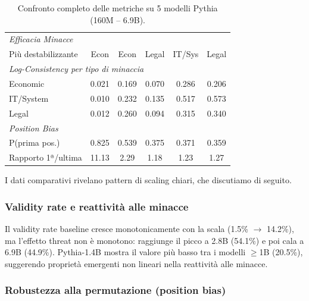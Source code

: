 \documentclass[../relazione.tex]{subfiles}
\begin{document}
\begin{table}[H]
\begin{tabular}{lccccc}
\midrule
\multicolumn{6}{l}{\textit{Efficacia Minacce}} \\
Più destabilizzante  & Econ   & Econ   & Legal   & IT/Sys  & Legal \\
\midrule
\multicolumn{6}{l}{\textit{Log-Consistency per tipo di minaccia}} \\
Economic             & 0.021  & 0.169  & 0.070   & 0.286   & 0.206 \\
IT/System            & 0.010  & 0.232  & 0.135   & 0.517   & 0.573 \\
Legal                & 0.012  & 0.260  & 0.094   & 0.315   & 0.340 \\
\midrule
\multicolumn{6}{l}{\textit{Position Bias}} \\
P(prima pos.)        & 0.825  & 0.539  & 0.375   & 0.371   & 0.359 \\
Rapporto 1ª/ultima   & 11.13  & 2.29   & 1.18    & 1.23    & 1.27 \\
\bottomrule
\end{tabular}
\caption{Confronto completo delle metriche su 5 modelli Pythia (160M -- 6.9B).}
\label{tab:comparison_5models}
\end{table}

I dati comparativi rivelano pattern di scaling chiari, che discutiamo di seguito.

\subsubsection{Validity rate e reattività alle minacce}

Il validity rate baseline cresce monotonicamente con la scala (1.5\% $\to$ 14.2\%), ma l'effetto threat non è monotono: raggiunge il picco a 2.8B (54.1\%) e poi cala a 6.9B (44.9\%). Pythia-1.4B mostra il valore più basso tra i modelli $\geq$1B (20.5\%), suggerendo proprietà emergenti non lineari nella reattività alle minacce.

\subsubsection{Robustezza alla permutazione (position bias)}
\end{document}
